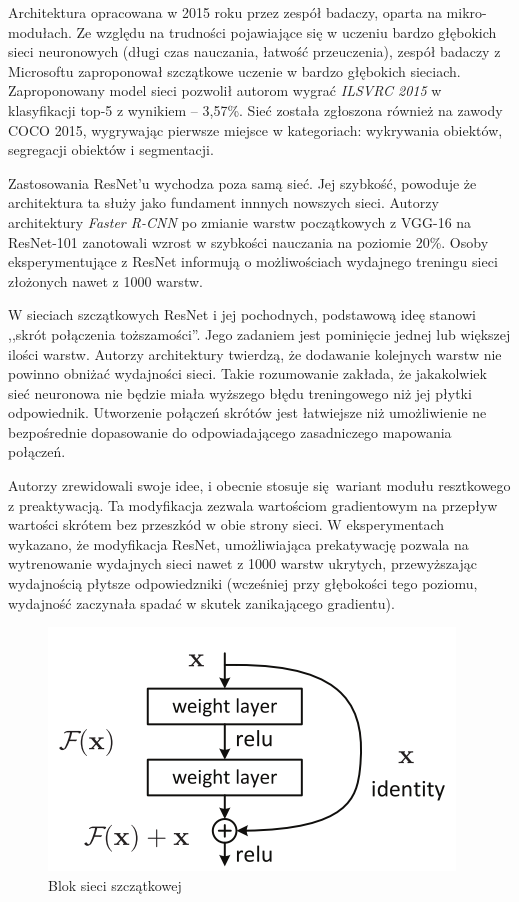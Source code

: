 \documentclass[12pt,a4paper,twoside,titlepage,openright]{book}
\begin{document}
Architektura opracowana w 2015 roku przez zespół badaczy, oparta na mikro-modułach. Ze względu na trudności pojawiające się w uczeniu bardzo głębokich sieci neuronowych (długi czas nauczania, łatwość przeuczenia), zespół badaczy z Microsoftu zaproponował szczątkowe uczenie w bardzo głębokich sieciach. Zaproponowany model sieci pozwolił autorom wygrać \textit{ILSVRC 2015} w klasyfikacji top-5 z wynikiem -- 3,57\%. Sieć została zgłoszona również na zawody COCO 2015, wygrywając pierwsze miejsce w kategoriach: wykrywania obiektów, segregacji obiektów i segmentacji. \cite{DBLP:journals/corr/HeZRS15}

Zastosowania ResNet'u wychodza poza samą sieć. Jej szybkość, powoduje że architektura ta służy jako fundament innnych nowszych sieci. Autorzy architektury \textit{Faster R-CNN} po zmianie warstw początkowych z VGG-16 na ResNet-101 zanotowali wzrost w szybkości nauczania na poziomie 20\%. Osoby eksperymentujące z ResNet informują o możliwościach wydajnego treningu sieci złożonych nawet z 1000 warstw. \cite{siteResnetOverview}

W sieciach szczątkowych ResNet i jej pochodnych, podstawową ideę stanowi ,,skrót połączenia toższamości''. Jego zadaniem jest pominięcie jednej lub większej ilości warstw. Autorzy architektury twierdzą, że dodawanie kolejnych warstw nie powinno obniżać wydajności sieci. Takie rozumowanie zakłada, że jakakolwiek sieć neuronowa nie będzie miała wyższego błędu treningowego niż jej płytki odpowiednik. Utworzenie połączeń skrótów jest łatwiejsze niż umożliwienie ne bezpośrednie dopasowanie do odpowiadającego zasadniczego mapowania połączeń.

Autorzy zrewidowali swoje idee, i obecnie stosuje się wariant modułu resztkowego z preaktywacją. Ta modyfikacja zezwala wartościom gradientowym na przepływ wartości skrótem bez przeszkód w obie strony sieci. W eksperymentach wykazano, że modyfikacja ResNet, umożliwiająca prekatywację pozwala na wytrenowanie wydajnych sieci nawet z 1000 warstw ukrytych, przewyższając wydajnością płytsze odpowiedzniki (wcześniej przy głębokości tego poziomu, wydajność zaczynała spadać w skutek zanikającego gradientu).

\begin{figure}[ht]
	\centering
			\includegraphics[resolution=100, scale=0.4]{residualBlock.png}
		\caption{Blok sieci szczątkowej}
				\label{fig:residualBlock}
\end{figure}
\end{document}
